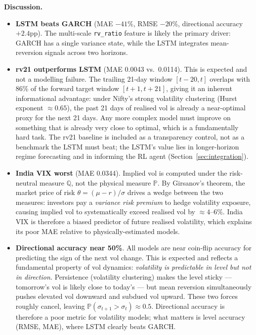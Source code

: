 \documentclass[12pt,a4paper]{article}
\begin{document}
\textbf{Discussion.}
\begin{itemize}[leftmargin=*]
  \item \textbf{LSTM beats GARCH} (MAE $-41\%$, RMSE $-20\%$, directional
        accuracy $+2.4$pp).  The multi-scale \texttt{rv\_ratio} feature is
        likely the primary driver: GARCH has a single variance state, while
        the LSTM integrates mean-reversion signals across two horizons.

  \item \textbf{rv21 outperforms LSTM} (MAE 0.0043 vs.\ 0.0114).  This is
        expected and not a modelling failure.  The trailing 21-day window
        $[t-20, t]$ overlaps with 86\% of the forward target window $[t+1, t+21]$,
        giving it an inherent informational advantage: under Nifty's strong
        volatility clustering (Hurst exponent $\approx 0.65$), the past 21 days
        of realised vol is already a near-optimal proxy for the next 21 days.
        Any more complex model must improve on something that is already very
        close to optimal, which is a fundamentally hard task.  The rv21 baseline
        is included as a transparency control, not as a benchmark the LSTM must
        beat; the LSTM's value lies in longer-horizon regime forecasting and
        in informing the RL agent (Section~\ref{sec:integration}).

  \item \textbf{India VIX worst} (MAE 0.0344).  Implied vol is computed under
        the risk-neutral measure $\mathbb{Q}$, not the physical measure
        $\mathbb{P}$.  By Girsanov's theorem, the market price of risk
        $\theta = (\mu-r)/\sigma$ drives a wedge between the two measures:
        investors pay a \emph{variance risk premium} to hedge volatility
        exposure, causing implied vol to systematically exceed realised vol by
        $\approx 4$--$6\%$.  India VIX is therefore a biased predictor of
        future realised volatility, which explains its poor MAE relative to
        physically-estimated models.

  \item \textbf{Directional accuracy near 50\%}.  All models are near
        coin-flip accuracy for predicting the sign of the next vol change.
        This is expected and reflects a fundamental property of vol dynamics:
        \emph{volatility is predictable in level but not in direction.}
        Persistence (volatility clustering) makes the level sticky ---
        tomorrow's vol is likely close to today's --- but mean reversion
        simultaneously pushes elevated vol downward and subdued vol upward.
        These two forces roughly cancel, leaving
        $\mathbb{P}(\sigma_{t+1}>\sigma_t)\approx 0.5$.  Directional accuracy
        is therefore a poor metric for volatility models; what matters is
        level accuracy (RMSE, MAE), where LSTM clearly beats GARCH.
\end{itemize}
\end{document}
